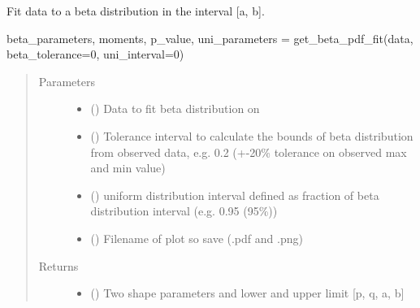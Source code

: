 \documentclass[letterpaper,10pt,english,openany,oneside]{sphinxmanual}
\begin{document}

\begin{fulllineitems}
\label{\detokenize{pygpc:pygpc.misc.get_beta_pdf_fit}}
Fit data to a beta distribution in the interval {[}a, b{]}.

beta\_parameters, moments, p\_value, uni\_parameters = get\_beta\_pdf\_fit(data, beta\_tolerance=0, uni\_interval=0)
\begin{quote}\begin{description}
\item[{Parameters}] \leavevmode\begin{itemize}
\item {} 
 () \textendash{} Data to fit beta distribution on

\item {} 
 (\sphinxstyleliteralemphasis{\sphinxupquote{, }}\sphinxstyleliteralemphasis{\sphinxupquote{, }}) \textendash{} Tolerance interval to calculate the bounds of beta distribution
from observed data, e.g. 0.2 (+-20\% tolerance on observed max and min value)

\item {} 
 (\sphinxstyleliteralemphasis{\sphinxupquote{, }}\sphinxstyleliteralemphasis{\sphinxupquote{, }}) \textendash{} uniform distribution interval defined as fraction of beta distribution interval (e.g. 0.95 (95\%))

\item {} 
 () \textendash{} Filename of plot so save (.pdf and .png)

\end{itemize}

\item[{Returns}] \leavevmode
\begin{itemize}
\item {} 
 () \textendash{} Two shape parameters and lower and upper limit {[}p, q, a, b{]}


\end{itemize}
\end{description}
\end{quote}
\end{fulllineitems}
\end{document}
